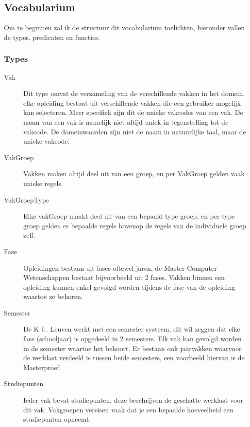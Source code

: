 \subsection{Vocabularium}
Om te beginnen zal ik de structuur dit vocabularium toelichten, hieronder vallen de types, predicaten en functies.
\subsubsection{Types}
\begin{description}
\item [Vak] Dit type omvat de verzameling van de verschillende vakken in het domein, elke opleiding bestaat uit verschillende vakken die een gebruiker mogelijk kan selecteren. Meer specifiek zijn dit de unieke vakcodes van een vak. De naam van een vak is namelijk niet altijd uniek in tegenstelling tot de vakcode. 
De domeinwaarden zijn niet de naam in natuurlijke taal, maar de unieke vakcode.
\item [VakGroep] Vakken maken altijd deel uit van een groep, en per VakGroep gelden vaak unieke regels. 
\item [VakGroepType] Elke vakGroep maakt deel uit van een bepaald type groep, en per type groep gelden er bepaalde regels bovenop de regels van de individuele groep zelf.
\item [Fase] Opleidingen bestaan uit fases oftewel jaren, de Master Computer Wetenschappen bestaat bijvoorbeeld uit 2 fases. Vakken binnen een opleiding kunnen enkel gevolgd worden tijdens de fase van de opleiding waartoe ze behoren. 
\item [Semester] De K.U. Leuven werkt met een semester systeem, dit wil zeggen dat elke fase (schooljaar) is opgedeeld in 2 semesters. Elk vak kan gevolgd worden in de semester waartoe het behoort. Er bestaan ook jaarvakken waarvoor de werklast verdeeld is tussen beide semesters, een voorbeeld hiervan is de Masterproef.
\item [Studiepunten] Ieder vak bevat studiepunten, deze beschrijven de geschatte werklast voor dit vak. Vakgroepen vereisen vaak dat je een bepaalde hoeveelheid een studiepunten opneemt. 
\end{description}

